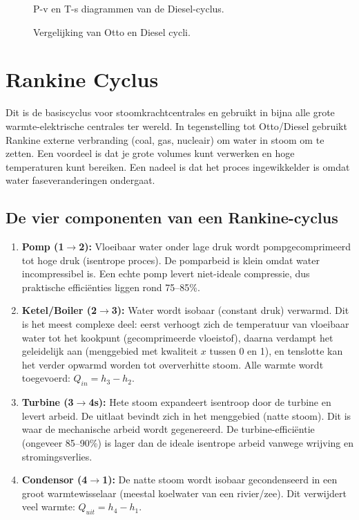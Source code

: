 \documentclass[a4paper,11pt,twoside]{report}
\begin{document}
\begin{figure}[H]
    \centering
    \caption{P-v en T-s diagrammen van de Diesel-cyclus.}
    \label{fig:diesel_pv}
\end{figure}

\begin{figure}[H]
    \centering
    \caption{Vergelijking van Otto en Diesel cycli.}
\end{figure}

\section{Rankine Cyclus}

Dit is de basiscyclus voor stoomkrachtcentrales en gebruikt in bijna alle grote warmte-elektrische centrales ter wereld. 
In tegenstelling tot Otto/Diesel gebruikt Rankine externe verbranding (coal, gas, nucleair) om water in stoom om te zetten. 
Een voordeel is dat je grote volumes kunt verwerken en hoge temperaturen kunt bereiken. 
Een nadeel is dat het proces ingewikkelder is omdat water faseveranderingen ondergaat.

\subsection*{De vier componenten van een Rankine-cyclus}

\begin{enumerate}
    \item \textbf{Pomp (1$\to$2):} Vloeibaar water onder lage druk wordt pompgecomprimeerd tot hoge druk (isentrope proces). De pomparbeid is klein omdat water incompressibel is. Een echte pomp levert niet-ideale compressie, dus praktische efficiënties liggen rond 75–85\%.
    
    \item \textbf{Ketel/Boiler (2$\to$3):} Water wordt isobaar (constant druk) verwarmd. Dit is het meest complexe deel: eerst verhoogt zich de temperatuur van vloeibaar water tot het kookpunt (gecomprimeerde vloeistof), daarna verdampt het geleidelijk aan (menggebied met kwaliteit $x$ tussen 0 en 1), en tenslotte kan het verder opwarmd worden tot oververhitte stoom. Alle warmte wordt toegevoerd: $Q_{in} = h_3 - h_2$.
    
    \item \textbf{Turbine (3$\to$4s):} Hete stoom expandeert isentroop door de turbine en levert arbeid. De uitlaat bevindt zich in het menggebied (natte stoom). Dit is waar de mechanische arbeid wordt gegenereerd. De turbine-efficiëntie (ongeveer 85–90\%) is lager dan de ideale isentrope arbeid vanwege wrijving en stromingsverlies.
    
    \item \textbf{Condensor (4$\to$1):} De natte stoom wordt isobaar gecondenseerd in een groot warmtewisselaar (meestal koelwater van een rivier/zee). Dit verwijdert veel warmte: $Q_{uit} = h_4 - h_1$.
\end{enumerate}
\end{document}
